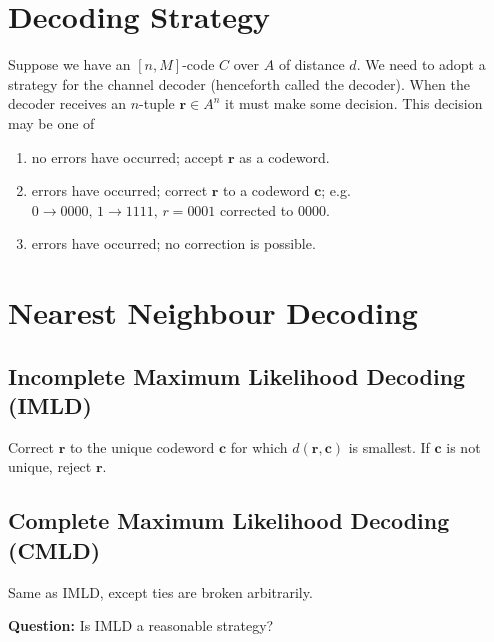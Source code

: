 
\section{Decoding Strategy}
Suppose we have an $ [n,M] $-code $ C $ over $ A $ of distance $ d $.
We need to adopt a strategy for the channel decoder (henceforth called the decoder).
When the decoder receives an $ n $-tuple $ \bm{r}\in A^n $ it must make some decision.
This decision may be one of
\begin{enumerate}[label=(\roman*)]
    \item no errors have occurred; accept $ \bm{r} $ as a codeword.
    \item errors have occurred; correct $ \bm{r} $ to a codeword $ \bm{c} $;
          e.g. $ 0 \rightarrow 0000,\,1 \rightarrow 1111,\,r=0001 $ corrected to
          $ 0000 $.
    \item errors have occurred; no correction is possible.
\end{enumerate}

\section{Nearest Neighbour Decoding}
\subsection{Incomplete Maximum Likelihood Decoding (IMLD)}
Correct $ \bm{r} $ to the unique codeword $ \bm{c} $ for which
$ d(\bm{r},\bm{c}) $ is smallest.
If $ \bm{c} $ is not unique, reject $ \bm{r} $.
\subsection{Complete Maximum Likelihood Decoding (CMLD)}
Same as IMLD, except ties are broken arbitrarily.

\textbf{Question:} Is IMLD a reasonable strategy?


